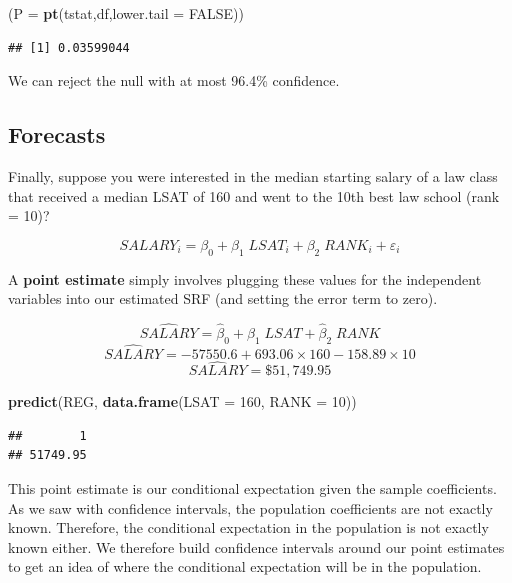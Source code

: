 \documentclass[
]{book}
\newenvironment{Shaded}{\begin{snugshade}}{\end{snugshade}}
\newcommand{\AttributeTok}[1]{\textcolor[rgb]{0.13,0.29,0.53}{#1}}
\newcommand{\ConstantTok}[1]{\textcolor[rgb]{0.56,0.35,0.01}{#1}}
\newcommand{\DecValTok}[1]{\textcolor[rgb]{0.00,0.00,0.81}{#1}}
\newcommand{\FunctionTok}[1]{\textcolor[rgb]{0.13,0.29,0.53}{\textbf{#1}}}
\newcommand{\NormalTok}[1]{#1}
\newcommand{\OtherTok}[1]{\textcolor[rgb]{0.56,0.35,0.01}{#1}}
\newcommand{\StringTok}[1]{\textcolor[rgb]{0.31,0.60,0.02}{#1}}
\begin{document}
\begin{Shaded}
\begin{Highlighting}[]
\NormalTok{(}\AttributeTok{P =} \FunctionTok{pt}\NormalTok{(tstat,df,}\AttributeTok{lower.tail =} \ConstantTok{FALSE}\NormalTok{))}
\end{Highlighting}
\end{Shaded}

\begin{verbatim}
## [1] 0.03599044
\end{verbatim}

We can reject the null with at most 96.4\% confidence.

\subsection*{Forecasts}\label{forecasts}

Finally, suppose you were interested in the median starting salary of a law class that received a median LSAT of 160 and went to the 10th best law school (rank = 10)?

\[SALARY_i = \beta_0 + \beta_1 \; LSAT_i + \beta_2 \; RANK_i + \varepsilon_i\]

A \textbf{point estimate} simply involves plugging these values for the independent variables into our estimated SRF (and setting the error term to zero).

\[\widehat{SALARY} = \hat{\beta}_0 + \hat{\beta}_1 \; LSAT + \hat{\beta}_2 \; RANK\]
\[\widehat{SALARY} = -57550.6 + 693.06 \times 160 -158.89 \times 10\]
\[\widehat{SALARY} = \$ 51,749.95\]

\begin{Shaded}
\begin{Highlighting}[]
\FunctionTok{predict}\NormalTok{(REG, }\FunctionTok{data.frame}\NormalTok{(}\StringTok{\textquotesingle{}LSAT\textquotesingle{}} \OtherTok{=} \DecValTok{160}\NormalTok{, }\StringTok{\textquotesingle{}RANK\textquotesingle{}} \OtherTok{=} \DecValTok{10}\NormalTok{))}
\end{Highlighting}
\end{Shaded}

\begin{verbatim}
##        1 
## 51749.95
\end{verbatim}

This point estimate is our conditional expectation given the sample coefficients. As we saw with confidence intervals, the population coefficients are not exactly known. Therefore, the conditional expectation in the population is not exactly known either. We therefore build confidence intervals around our point estimates to get an idea of where the conditional expectation will be in the population.
\end{document}
